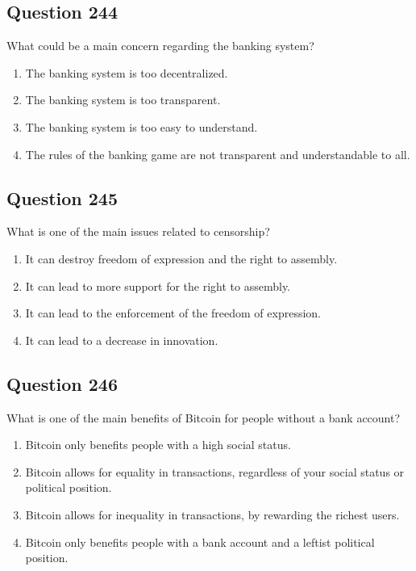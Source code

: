 \documentclass[12pt,a4paper]{article}
\begin{document}
\bigskip


\subsection*{Question 244}
What could be a main concern regarding the banking system?

\begin{enumerate}[label=\Alph*., leftmargin=*]
\item The banking system is too decentralized.
\item The banking system is too transparent.
\item The banking system is too easy to understand.
\item The rules of the banking game are not transparent and understandable to all.
\end{enumerate}

\bigskip


\subsection*{Question 245}
What is one of the main issues related to censorship?

\begin{enumerate}[label=\Alph*., leftmargin=*]
\item It can destroy freedom of expression and the right to assembly.
\item It can lead to more support for the right to assembly.
\item It can lead to the enforcement of the freedom of expression.
\item It can lead to a decrease in innovation.
\end{enumerate}

\bigskip


\subsection*{Question 246}
What is one of the main benefits of Bitcoin for people without a bank account?

\begin{enumerate}[label=\Alph*., leftmargin=*]
\item Bitcoin only benefits people with a high social status.
\item Bitcoin allows for equality in transactions, regardless of your social status or political position.
\item Bitcoin allows for inequality in transactions, by rewarding the richest users.
\item Bitcoin only benefits people with a bank account and a leftist political position.
\end{enumerate}
\end{document}
